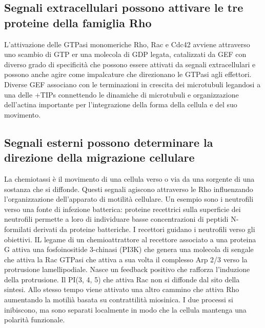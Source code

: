 \subsection{Segnali extracellulari possono attivare le tre proteine della famiglia Rho}
L'attivazione delle GTPasi monomeriche Rho, Rac e Cdc42 avviene attraverso uno scambio di GTP er una molecola di GDP legata, catalizzati da GEF con diverso grado di specificit\`a che 
possono essere attivati da segnali extracellulari e possono anche agire come impalcature che direzionano le GTPasi agli effettori. Diverse GEF associano con le terminazioni in crescita
dei microtubuli legandosi a una delle +TIPs connettendo le dinamiche di microtubuli e organizzazione dell'actina importante per l'integrazione della forma della cellula e del suo 
movimento. 
\subsection{Segnali esterni possono determinare la direzione della migrazione cellulare}
La chemiotassi \`e il movimento di una cellula verso o via da una sorgente di una sostanza che si diffonde. Questi segnali agiscono attraverso le Rho influenzando l'organizzazione 
dell'apparato di  motilit\`a cellulare. Un esempio sono i neutrofili verso una fonte di infezione batterica: proteine recettrici sulla superficie dei neutrofili permette a loro di 
individuare basse concentrazioni di peptidi N-formilati derivati da proteine batteriche. I recettori guidano i neutrofili verso gli obiettivi. IL legame di un chemioattrattore al
recettore associato a una proteina G attiva una fosfoinositide 3-chinasi (PI3K) che genera una molecola di sengale che attiva la Rac GTPasi che attiva a sua volta il complesso Arp 
2/3 verso la protrusione lamellipodiale. Nasce un feedback positivo che rafforza l'induzione della protrusione. Il PI(3, 4, 5) che attiva Rac non si diffonde dal sito della sintesi. 
Allo stesso tempo viene attivato una altro cammino che attiva Rho aumentando la motili\`a basata su contrattilit\`a miosinica. I due processi si inibiscono, ma sono separati localmente
in modo che la cellula mantenga una polarit\`a funzionale. 
